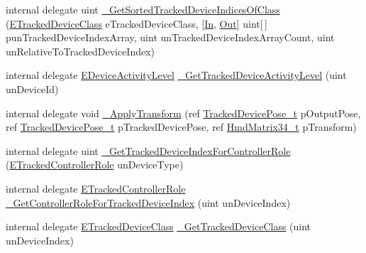 \begin{DoxyCompactItemize}
\item 
internal delegate uint \mbox{\hyperlink{struct_valve_1_1_v_r_1_1_i_v_r_system_acb35a55e60800abca1d3216ba5c3b90e}{\+\_\+\+Get\+Sorted\+Tracked\+Device\+Indices\+Of\+Class}} (\mbox{\hyperlink{namespace_valve_1_1_v_r_aa1a3c2765fe53acb85372a57652c47a1}{E\+Tracked\+Device\+Class}} e\+Tracked\+Device\+Class, \mbox{[}\mbox{\hyperlink{namespace_valve_1_1_v_r_a1e6192cb5ddaf204afab87ccb5728780aefeb369cccbd560588a756610865664c}{In}}, \mbox{\hyperlink{namespace_valve_1_1_v_r_a1e6192cb5ddaf204afab87ccb5728780a7c147cda9e49590f6abe83d118b7353b}{Out}}\mbox{]} uint\mbox{[}$\,$\mbox{]} pun\+Tracked\+Device\+Index\+Array, uint un\+Tracked\+Device\+Index\+Array\+Count, uint un\+Relative\+To\+Tracked\+Device\+Index)
\item 
internal delegate \mbox{\hyperlink{namespace_valve_1_1_v_r_a44a7a02e482d63dc5e0c0851a2ad775e}{E\+Device\+Activity\+Level}} \mbox{\hyperlink{struct_valve_1_1_v_r_1_1_i_v_r_system_af6da0a3c81f4645a74f3ae34d3c050b6}{\+\_\+\+Get\+Tracked\+Device\+Activity\+Level}} (uint un\+Device\+Id)
\item 
internal delegate void \mbox{\hyperlink{struct_valve_1_1_v_r_1_1_i_v_r_system_a4b3c449999bda4d5effec48e5b5d6dfa}{\+\_\+\+Apply\+Transform}} (ref \mbox{\hyperlink{struct_valve_1_1_v_r_1_1_tracked_device_pose__t}{Tracked\+Device\+Pose\+\_\+t}} p\+Output\+Pose, ref \mbox{\hyperlink{struct_valve_1_1_v_r_1_1_tracked_device_pose__t}{Tracked\+Device\+Pose\+\_\+t}} p\+Tracked\+Device\+Pose, ref \mbox{\hyperlink{struct_valve_1_1_v_r_1_1_hmd_matrix34__t}{Hmd\+Matrix34\+\_\+t}} p\+Transform)
\item 
internal delegate uint \mbox{\hyperlink{struct_valve_1_1_v_r_1_1_i_v_r_system_a78755de15fec7aaaccc22d7539a7492a}{\+\_\+\+Get\+Tracked\+Device\+Index\+For\+Controller\+Role}} (\mbox{\hyperlink{namespace_valve_1_1_v_r_a7814f024ae1755837d784b5263e05792}{E\+Tracked\+Controller\+Role}} un\+Device\+Type)
\item 
internal delegate \mbox{\hyperlink{namespace_valve_1_1_v_r_a7814f024ae1755837d784b5263e05792}{E\+Tracked\+Controller\+Role}} \mbox{\hyperlink{struct_valve_1_1_v_r_1_1_i_v_r_system_a38e3886f059ec9bd5728bcd5c5561e49}{\+\_\+\+Get\+Controller\+Role\+For\+Tracked\+Device\+Index}} (uint un\+Device\+Index)
\item 
internal delegate \mbox{\hyperlink{namespace_valve_1_1_v_r_aa1a3c2765fe53acb85372a57652c47a1}{E\+Tracked\+Device\+Class}} \mbox{\hyperlink{struct_valve_1_1_v_r_1_1_i_v_r_system_a012f6620d3faad15d7622c5c53b091e8}{\+\_\+\+Get\+Tracked\+Device\+Class}} (uint un\+Device\+Index)

\end{DoxyCompactItemize}
